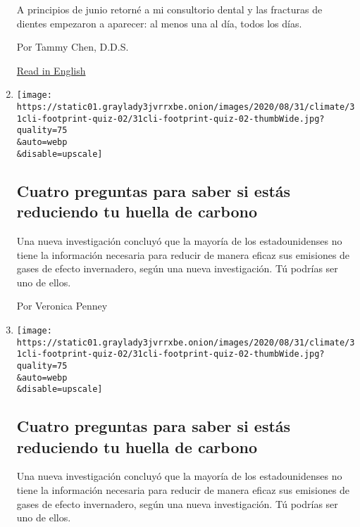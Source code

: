 \begin{enumerate}
  A principios de junio retorné a mi consultorio dental y las fracturas
  de dientes empezaron a aparecer: al menos una al día, todos los días.

  Por Tammy Chen, D.D.S.

  \href{https://www.nytimes3xbfgragh.onion/2020/09/08/well/live/dentists-tooth-teeth-cracks-fractures-coronavirus-stress-grinding.html}{Read
  in English}
\item
  \href{/es/interactive/2020/09/03/espanol/ciencia-y-tecnologia/quiz-huella-de-carbono.html}{}

  \texttt{[image: https://static01.graylady3jvrrxbe.onion/images/2020/08/31/climate/31cli-footprint-quiz-02/31cli-footprint-quiz-02-thumbWide.jpg?quality=75\\\&auto=webp\\\&disable=upscale]}

  \hypertarget{cuatro-preguntas-para-saber-si-estuxe1s-reduciendo-tu-huella-de-carbono}{%
  \subsection{Cuatro preguntas para saber si estás reduciendo tu huella
  de
  carbono}\label{cuatro-preguntas-para-saber-si-estuxe1s-reduciendo-tu-huella-de-carbono}}

  Una nueva investigación concluyó que la mayoría de los estadounidenses
  no tiene la información necesaria para reducir de manera eficaz sus
  emisiones de gases de efecto invernadero, según una nueva
  investigación. Tú podrías ser uno de ellos.

  Por Veronica Penney
\item
  \href{/es/interactive/2020/09/03/espanol/ciencia-y-tecnologia/03clima-quiz.html}{}

  \texttt{[image: https://static01.graylady3jvrrxbe.onion/images/2020/08/31/climate/31cli-footprint-quiz-02/31cli-footprint-quiz-02-thumbWide.jpg?quality=75\\\&auto=webp\\\&disable=upscale]}

  \hypertarget{cuatro-preguntas-para-saber-si-estuxe1s-reduciendo-tu-huella-de-carbono-1}{%
  \subsection{Cuatro preguntas para saber si estás reduciendo tu huella
  de
  carbono}\label{cuatro-preguntas-para-saber-si-estuxe1s-reduciendo-tu-huella-de-carbono-1}}

  Una nueva investigación concluyó que la mayoría de los estadounidenses
  no tiene la información necesaria para reducir de manera eficaz sus
  emisiones de gases de efecto invernadero, según una nueva
  investigación. Tú podrías ser uno de ellos.


\end{enumerate}
